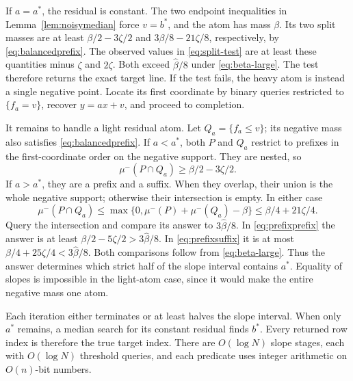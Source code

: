 If $a=a^*$, the residual is constant. The two endpoint inequalities in Lemma~\ref{lem:noisymedian} force $v=b^*$, and the atom has mass $\beta$. Its two split masses are at least $\beta/2-3\zeta/2$ and $3\beta/8-21\zeta/8$, respectively, by \eqref{eq:balancedprefix}. The observed values in \eqref{eq:split-test} are at least these quantities minus $\zeta$ and $2\zeta$. Both exceed $\hat\beta/8$ under \eqref{eq:beta-large}. The test therefore returns the exact target line. If the test fails, the heavy atom is instead a single negative point. Locate its first coordinate by binary queries restricted to $\{f_a=v\}$, recover $y=ax+v$, and proceed to completion.

It remains to handle a light residual atom. Let $Q_a=\{f_a\le v\}$; its negative mass also satisfies \eqref{eq:balancedprefix}. If $a<a^*$, both $P$ and $Q_a$ restrict to prefixes in the first-coordinate order on the negative support. They are nested, so
\begin{equation}
 \mu^-(P\cap Q_a)\ge\beta/2-3\zeta/2.
\label{eq:prefixprefix}
\end{equation}
If $a>a^*$, they are a prefix and a suffix. When they overlap, their union is the whole negative support; otherwise their intersection is empty. In either case
\begin{equation}
 \mu^-(P\cap Q_a)
 \le\max\{0,\mu^-(P)+\mu^-(Q_a)-\beta\}
 \le\beta/4+21\zeta/4.
\label{eq:prefixsuffix}
\end{equation}
Query the intersection and compare its answer to $3\hat\beta/8$. In \eqref{eq:prefixprefix} the answer is at least $\beta/2-5\zeta/2>3\hat\beta/8$. In \eqref{eq:prefixsuffix} it is at most $\beta/4+25\zeta/4<3\hat\beta/8$. Both comparisons follow from \eqref{eq:beta-large}. Thus the answer determines which strict half of the slope interval contains $a^*$. Equality of slopes is impossible in the light-atom case, since it would make the entire negative mass one atom.

Each iteration either terminates or at least halves the slope interval. When only $a^*$ remains, a median search for its constant residual finds $b^*$. Every returned row index is therefore the true target index. There are $O(\log N)$ slope stages, each with $O(\log N)$ threshold queries, and each predicate uses integer arithmetic on $O(n)$-bit numbers.



